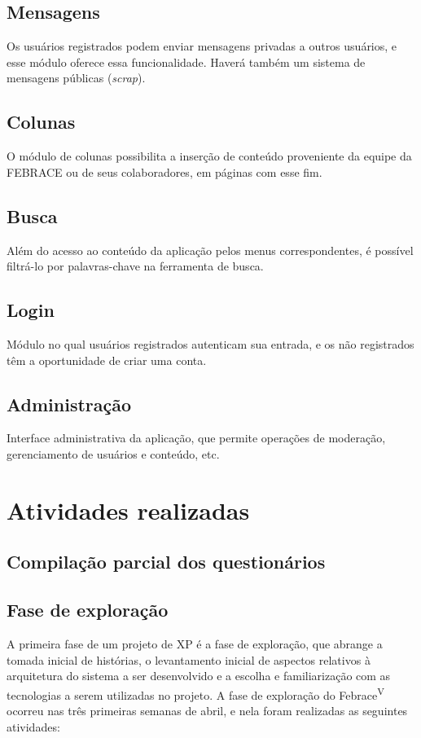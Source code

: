 \documentclass[a4paper,12pt,font=plain,header=plain]{abnt}
\begin{document}
		\section{Mensagens}
		Os usuários registrados podem enviar mensagens privadas a outros usuários, e esse módulo oferece essa funcionalidade. Haverá também um sistema de mensagens públicas (\textit{scrap}).

		\section{Colunas}
		O módulo de colunas possibilita a inserção de conteúdo proveniente da equipe da FEBRACE ou de seus colaboradores, em páginas com esse fim.

		\section{Busca}
		Além do acesso ao conteúdo da aplicação pelos menus correspondentes, é possível filtrá-lo por palavras-chave na ferramenta de busca.

		\section{Login}
		Módulo no qual usuários registrados autenticam sua entrada, e os não registrados têm a oportunidade de criar uma conta.

		\section{Administração}
		Interface administrativa da aplicação, que permite operações de moderação, gerenciamento de usuários e conteúdo, etc.

\chapter{Atividades realizadas}

  \section{Compilação parcial dos questionários}

  \section{Fase de exploração}
    A primeira fase de um projeto de XP é a fase de exploração\cite{beck04}, que abrange a tomada inicial de histórias, o levantamento inicial de aspectos relativos à arquitetura do sistema a ser desenvolvido e a escolha e familiarização com as tecnologias a serem utilizadas no projeto.
    A fase de exploração do Febrace\textsuperscript{V} ocorreu nas três primeiras semanas de abril, e nela foram realizadas as seguintes atividades:
\end{document}
